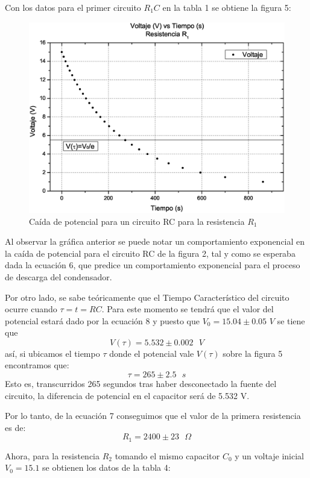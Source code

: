 \documentclass[10pt,letter]{article}
\begin{document}
Con los datos para el primer circuito $R_1C$ en la tabla 1 se obtiene la figura 5:



\begin{figure}[H]
\centering
\includegraphics[scale=0.45]{Resistencia1}
\caption{Caída de potencial para un circuito RC para la resistencia $R_1$}
\label{RCcarga}
\end{figure}

\begin{multicols}{2}
Al observar la gráfica anterior se puede notar un comportamiento exponencial en la caída de potencial para el circuito RC de la figura 2, tal y como se esperaba dada la ecuación 6, que predice un comportamiento exponencial para el proceso de descarga del condensador.  

Por otro lado, se sabe teóricamente que el Tiempo Característico del circuito ocurre cuando $\tau=t=RC$. Para este momento se tendrá que el valor del potencial estará dado por la ecuación 8 y puesto que $V_0=15.04 \pm0.05$ $V$ se tiene que 
$$V(\tau)=5.532 \pm 0.002 \text{ }V$$
así, si ubicamos el tiempo $\tau$ donde el potencial vale $V(\tau)$ sobre la figura 5 encontramos que:
$$\tau=265\pm2.5 \text{ }s$$
Esto es, transcurridos 265 segundos tras haber desconectado la fuente del circuito, la diferencia de potencial en el capacitor será de 5.532 V.

Por lo tanto, de la ecuación 7 conseguimos que el valor de la primera resistencia es de:
$$R_1=2400\pm23\text{ }\Omega$$

Ahora, para la resistencia $R_2$  tomando el mismo capacitor $C_0$ y un voltaje inicial $V_0=15.1$ se obtienen los datos de la tabla 4:

\end{multicols}
\end{document}
